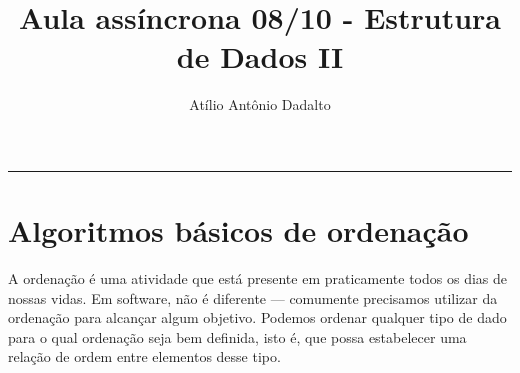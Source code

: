 \documentclass[a4paper, 11pt, brazil]{article}
\begin{document}
	\title{Aula assíncrona 08/10 - Estrutura de Dados II}
	\author{Atílio Antônio Dadalto}
	\date{}
	\maketitle
	    \vspace{-3em}
		\hrule

\section*{Algoritmos básicos de ordenação}
A ordenação é uma atividade que está presente em praticamente todos os dias de nossas vidas. Em software, não é diferente --- comumente precisamos utilizar da ordenação para alcançar algum objetivo. Podemos ordenar qualquer tipo de dado para o qual ordenação seja bem definida, isto é, que possa estabelecer uma relação de ordem entre elementos desse tipo.

\end{document}
